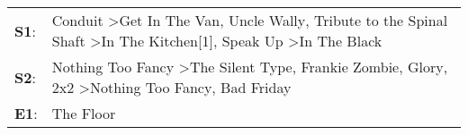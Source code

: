 \begin{supertabular}{p{0.03\textwidth}p{0.92\textwidth}}
 \textbf{S1}:  &  Conduit\textsuperscript{} \textgreater \enspace Get In The Van\textsuperscript{}, \enspace Uncle Wally\textsuperscript{}, \enspace Tribute to the Spinal Shaft\textsuperscript{} \textgreater \enspace In The Kitchen[1]\textsuperscript{}, \enspace Speak Up\textsuperscript{} \textgreater \enspace In The Black\textsuperscript{}  \enspace  \\
 \textbf{S2}:  &                             Nothing Too Fancy\textsuperscript{} \textgreater \enspace The Silent Type\textsuperscript{}, \enspace Frankie Zombie\textsuperscript{}, \enspace Glory\textsuperscript{}, \enspace 2x2\textsuperscript{} \textgreater \enspace Nothing Too Fancy\textsuperscript{}, \enspace Bad Friday\textsuperscript{}  \enspace  \\
 \textbf{E1}:  &                                                                                                                                                                                                                                                                                                           The Floor\textsuperscript{}  \enspace  \\
\end{supertabular}
